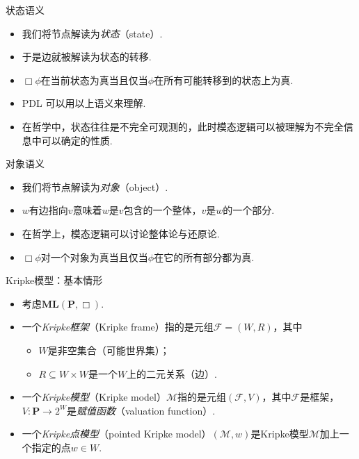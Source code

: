     \begin{frame}{状态语义}
    \begin{itemize}
    \item 我们将节点解读为\emph{状态}（state）.
    \item 于是边就被解读为状态的转移.
    \item $\Box\phi$在当前状态为真当且仅当$\phi$在所有可能转移到的状态上为真.
    \item PDL 可以用以上语义来理解.
    \item 在哲学中，状态往往是不完全可观测的，此时模态逻辑可以被理解为不完全信息中可以确定的性质.
    \end{itemize}
    \end{frame}
    
    \begin{frame}{对象语义}
    \begin{itemize}
    \item 我们将节点解读为\emph{对象}（object）.
    \item $w$有边指向$v$意味着$w$是$v$包含的一个整体，$v$是$w$的一个部分.
    \item 在哲学上，模态逻辑可以讨论整体论与还原论.
    \item $\Box\phi$对一个对象为真当且仅当$\phi$在它的所有部分都为真.
    \end{itemize}
    \end{frame}
    
    \begin{frame}{Kripke模型：基本情形}
    \begin{itemize}
        \item 考虑$\mathbf{ML}(\mathbf{P},\Box)$.
        \item 一个\emph{Kripke框架}（Kripke frame）指的是元组$\mathcal F=(W,R)$，其中
        \begin{itemize}
            \item $W$是非空集合（可能世界集）；
            \item $R\subseteq W\times W$是一个$W$上的二元关系（边）.
        \end{itemize}
        \item 一个\emph{Kripke模型}（Kripke model）$\mathcal{M}$指的是元组$(\mathcal F,V)$，其中$\mathcal F$是框架，$V:\mathbf P\to 2^W$是\emph{赋值函数}（valuation function）.
        \item 一个\emph{Kripke点模型}（pointed Kripke model）$(\mathcal{M},w)$是Kripke模型$\mathcal M$加上一个指定的点$w\in W$.
    \end{itemize}
    \end{frame}
    
